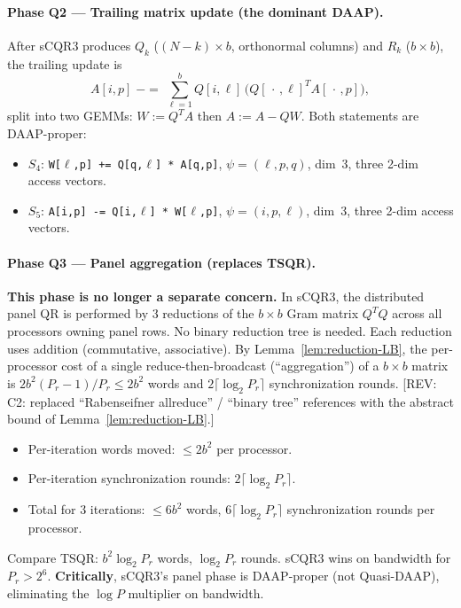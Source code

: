 \documentclass[11pt]{article}
\newcommand{\REV}[1]{\textcolor{blue!60!black}{\small\textsf{[REV: #1]}}}
\begin{document}
\paragraph{Phase Q2 --- Trailing matrix update (the dominant DAAP).}
After sCQR3 produces $Q_k$ ($(N{-}k) \times b$, orthonormal columns)
and $R_k$ ($b \times b$), the trailing update is
\[
  A[i,p] \;\mathrel{{-}{=}}\; \sum_{\ell=1}^{b} Q[i,\ell]\,
       \big(Q[\,\cdot\,,\ell]^T A[\,\cdot\,,p]\big),
\]
split into two GEMMs: $W := Q^T A$ then $A := A - QW$. Both statements
are DAAP-proper:
\begin{itemize}[leftmargin=2em]
  \item $S_4$: \texttt{W[$\ell$,p] += Q[q,$\ell$] * A[q,p]},
    $\psi = (\ell,p,q)$, dim~3, three 2-dim access vectors.
  \item $S_5$: \texttt{A[i,p] -= Q[i,$\ell$] * W[$\ell$,p]},
    $\psi = (i,p,\ell)$, dim~3, three 2-dim access vectors.
\end{itemize}

\paragraph{Phase Q3 --- Panel aggregation (replaces TSQR).}
\textbf{This phase is no longer a separate concern.} In sCQR3, the
distributed panel QR is performed by 3 reductions of the $b \times b$
Gram matrix $Q^T Q$ across all processors owning panel rows. No binary
reduction tree is needed. Each reduction uses addition (commutative,
associative). By Lemma~\ref{lem:reduction-LB}, the per-processor cost
of a single reduce-then-broadcast (``aggregation'') of a $b \times b$
matrix is $2 b^2 (P_r - 1)/P_r \le 2b^2$ words and
$2 \lceil \log_2 P_r \rceil$ synchronization rounds. \REV{C2: replaced
``Rabenseifner allreduce'' / ``binary tree'' references with the
abstract bound of Lemma~\ref{lem:reduction-LB}.}
\begin{itemize}[leftmargin=2em]
  \item Per-iteration words moved: $\le 2 b^2$ per processor.
  \item Per-iteration synchronization rounds:
    $2 \lceil \log_2 P_r \rceil$.
  \item Total for 3 iterations: $\le 6 b^2$ words,
    $6 \lceil \log_2 P_r \rceil$ synchronization rounds per processor.
\end{itemize}
Compare TSQR: $b^2 \log_2 P_r$ words, $\log_2 P_r$ rounds. sCQR3 wins
on bandwidth for $P_r > 2^6$. \textbf{Critically}, sCQR3's panel phase
is DAAP-proper (not Quasi-DAAP), eliminating the $\log P$ multiplier on
bandwidth.
\end{document}
